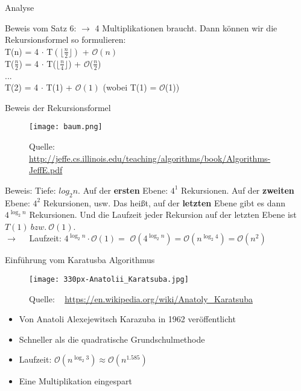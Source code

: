 \documentclass{beamer}
\begin{document}
\begin{frame}{Analyse}
\begin{block}{Beweis vom Satz 6: }
$\rightarrow$ 4 Multiplikationen braucht. Dann können wir die Rekursionsformel so formulieren: \\
\quad		T(n) = 4 $\cdot$ T$(\lfloor \frac{n}{2}\rfloor)$ + $\mathcal{O}(n)$\\
\quad		T($\frac{n}{2}$) = 4 $\cdot$ T($\lfloor \frac{n}{4}\rfloor$) + $\mathcal{O}$($\frac{n}{2}$)\\
\quad		...\\
\quad		T(2) = 4 $\cdot$ T(1) + $\mathcal{O}(1)$ \quad (wobei T(1) = $\mathcal{O}$(1))\\
\end{block}
\end{frame}

\begin{frame}{Beweis der Rekursionsformel}
\begin{figure}[!ht]  
    \centering  
    \texttt{[image: baum.png]}
    \caption{\footnotesize Quelle: \  \textcolor{blue}{ \href{http://jeffe.cs.illinois.edu/teaching/algorithms/book/Algorithms-JeffE.pdf}{http://jeffe.cs.illinois.edu/teaching/algorithms/book/Algorithms-JeffE.pdf}}}  
\end{figure}  


\begin{block}{Beweis: }
Tiefe: $log_{2}{n}$.  
Auf der \textbf{ersten} Ebene: $4^{1}$ Rekursionen. Auf der \textbf{zweiten} Ebene: $4^{2}$ Rekursionen, usw. Das heißt, auf der \textbf{letzten} Ebene gibt es dann $4^{\log_2{n}}$ Rekursionen. Und die Laufzeit jeder Rekursion auf der letzten Ebene ist $T(1) \ bzw. \ \mathcal{O}(1)$.\\
$\rightarrow \quad$ Laufzeit: $4^{\log_{2}{n}} \cdot \mathcal{O}(1) = $ $ \mathcal{O}( 4^{\log_{2}{n}}) = \mathcal{O}(n^{\log_{2}{4} }) = \mathcal{O} (n^{2})$\\
\end{block}
\end{frame}

\begin{frame}{Einführung vom Karatusba Algorithmus}
\begin{figure}[!ht]  
    \centering  
    \texttt{[image: 330px-Anatolii\_Karatsuba.jpg]}
    \caption{\footnotesize Quelle: \  \textcolor{blue}{ \href{https://en.wikipedia.org/wiki/Anatoly_Karatsuba}{https://en.wikipedia.org/wiki/Anatoly_Karatsuba}}}  
\end{figure}  

\begin{itemize}
    \item Von Anatoli Alexejewitsch Karazuba in 1962 veröffentlicht
    \item Schneller als die quadratische Grundschulmethode
    \item Laufzeit: $\mathcal{O}(n^{\log_2{3}}) \approx \mathcal{O}(n^{1.585})$
    \item Eine Multiplikation eingespart
\end{itemize}
\end{frame}
\end{document}
